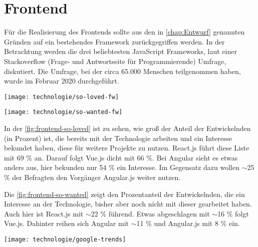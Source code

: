 \section{Frontend} \label{sec:Frontend}
Für die Realisierung des Frontends sollte aus den in \autoref{chap:Entwurf} genannten Gründen auf ein bestehendes Framework zurückgegriffen werden. In der Betrachtung werden die drei beliebtesten JavaScript Frameworks, laut einer Stackoverflow (Frage- und Antwortseite für Programmierende) Umfrage, diskutiert. Die Umfrage, bei der circa 65.000 Menschen teilgenommen haben, wurde im Februar 2020 durchgeführt. \cite{stackexchangeStackOverflowDeveloper2020}

\begin{center}
	\texttt{[image: technologie/so-loved-fw]}
	\label{fig:frontend-so-loved}
\end{center}

\begin{center}
	\texttt{[image: technologie/so-wanted-fw]}
	\label{fig:frontend-so-wanted}
\end{center}

In der \autoref{fig:frontend-so-loved} ist zu sehen, wie groß der Anteil der Entwickelnden (in Prozent) ist, die bereits mit der Technologie arbeiten und ein Interesse bekundet haben, diese für weitere Projekte zu nutzen. React.js führt diese Liste mit 69 \% an. Darauf folgt Vue.js dicht mit 66 \%. Bei Angular sieht es etwas anders aus, hier bekunden nur 54 \% ein Interesse. Im Gegensatz dazu wollen $\sim$25 \% der Befragten den Vorgänger Angular.js weiter nutzen.

Die \autoref{fig:frontend-so-wanted} zeigt den Prozentanteil der Entwickelnden, die ein Interesse an der Technologie, bisher aber noch nicht mit dieser gearbeitet haben. Auch hier ist React.js mit $\sim$22 \% führend. Etwas abgeschlagen mit $\sim$16 \% folgt Vue.js. Dahinter reihen sich Angular mit $\sim$11 \% und Angular.js mit 8 \% ein.

\begin{center}
	\texttt{[image: technologie/google-trends]}
	\label{fig:frontend-google-trends}
\end{center}

